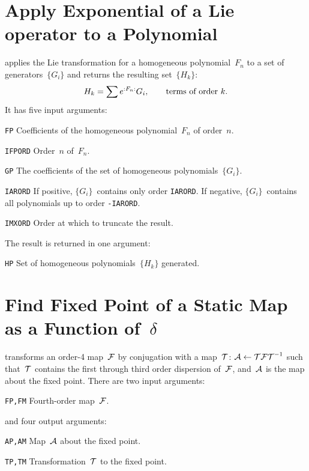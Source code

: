 \section{Apply Exponential of a Lie operator to a Polynomial}
\label{LMEXPO}
applies the Lie transformation for a homogeneous polynomial~$F_n$
to a set of generators~$\{G_i\}$ and returns the resulting
set~$\{H_k\}$:
\[
H_k = \sum e^{{:}{F_n}{:}} G_i, \qquad \hbox{terms of order }k.
\]
It has five input arguments:
\begin{mylist}
\item[\tt FP]
Coefficients of the homogeneous polynomial~$F_n$ of order~$n$.
\item[\tt IFPORD]
Order~$n$ of~$F_n$.
\item[\tt GP]
The coefficients of the set of homogeneous polynomials~$\{G_i\}$.
\item[\tt IARORD]
If positive, $\{G_i\}$~contains only order {\tt IARORD}.
If negative, $\{G_i\}$~contains all polynomials up to order 
{\tt -IARORD}.
\item[\tt IMXORD]
Order at which to truncate the result.
\end{mylist}
The result is returned in one argument:
\begin{mylist}
\item[\tt HP]
Set of homogeneous polynomials~$\{H_k\}$ generated.
\end{mylist}
 
\section{Find Fixed Point of a Static Map as a Function of~$\delta$}
\label{LMFIXP}
transforms an order-4 map~$\cal F$ by conjugation with a map~$\cal T$:
${\cal A} \leftarrow {\cal T \cal F \cal T}^{-1}$
such that~$\cal T$ contains the first through third order dispersion
of~$\cal F$,
and~$\cal A$ is the map about the fixed point.
There are two input arguments:
\begin{mylist}
\item[\tt FP,FM]
Fourth-order map~$\cal F$.
\end{mylist}
and four output arguments:
\begin{mylist}
\item[\tt AP,AM]
Map~$\cal A$ about the fixed point.
\item[\tt TP,TM]
Transformation~$\cal T$ to the fixed point.
\end{mylist}
 

